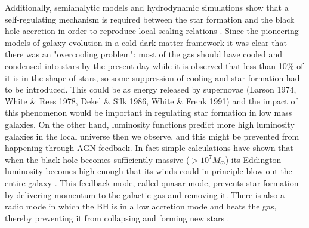 Additionally, semianalytic models and hydrodynamic simulations show that a self-regulating mechanism is required between the star formation and the black hole accretion in order to reproduce local scaling relations \citep[see][for a review]{2015ARA&A..53...51S}. Since the pioneering models of galaxy evolution in a cold dark matter framework it was clear that there was an "overcooling problem": most of the gas should have cooled and condensed into stars by the present day while it is observed that less than 10\% of it is in the shape of stars, so some suppression of cooling and star formation had to be introduced. This could be as energy released by supernovae (Larson 1974, White \& Rees 1978, Dekel \& Silk 1986, White \& Frenk 1991) and the impact of this phenomenon would be important in regulating star formation in low mass galaxies. On the other hand, luminosity functions predict more high luminosity galaxies in the local universe then we observe, and this might be prevented from happening through AGN feedback. In fact simple calculations have shown that when the black hole becomes sufficiently massive ($> 10^7 M_\odot$) its Eddington luminosity becomes high enough that its winds could in principle blow out the entire galaxy \citep{1998A&A...331L...1S}. This feedback mode, called quasar mode, prevents star formation by delivering momentum to the galactic gas and removing it. There is also a radio mode in which the BH is in a low accretion mode and heats the gas, thereby preventing it from collapsing and forming new stars \citep{2017NatAs...1E.165H}.
    
